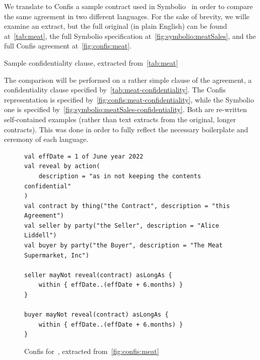 We translate to Confis a sample contract used in Symbolio~\cite{symboleo2020} in order to compare the same agreement in two different languages.
For the sake of brevity, we wille examine an extract, but the full original (in plain English) can be found at~\autoref{tab:meat}, the full Symbolio specification at~\autoref{fig:symbolio:meatSales}, and the full Confis agreement at~\autoref{fig:confis:meat}.

\begin{table}[h]
    \centering
    \setlength{\fboxsep}{10pt}
    \caption[Sample Confidentiality clause]{Sample confidentiality clause, extracted from~\autoref{tab:meat}}
    \label{tab:meat-confidentiality}
\end{table}

The comparison will be performed on a rather simple clause of the agreement, a confidentiality clause specified by~\autoref{tab:meat-confidentiality}.
The Confis representation is specified by~\autoref{fig:confis:meat-confidentiality}, while the Symbolio one is specified by~\autoref{fig:symbolio:meatSales-confidentiality}.
Both are re-written self-contained examples (rather than text extracts from the original, longer contracts).
This was done in order to fully reflect the necessary boilerplate and ceremony of each language.\\


\begin{figure}[h]
    \centering
    \begin{verbatim}
val effDate = 1 of June year 2022
val reveal by action(
    description = "as in not keeping the contents confidential"
)
val contract by thing("the Contract", description = "this Agreement")
val seller by party("the Seller", description = "Alice Liddell")
val buyer by party("the Buyer", description = "The Meat Supermarket, Inc")

seller mayNot reveal(contract) asLongAs {
    within { effDate..(effDate + 6.months) }
}

buyer mayNot reveal(contract) asLongAs {
    within { effDate..(effDate + 6.months) }
}
    \end{verbatim}
    \caption{Confis for~, extracted from~\autoref{fig:confis:meat}}
    \label{fig:confis:meat-confidentiality}
\end{figure}

